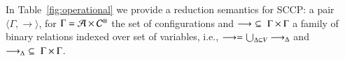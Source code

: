 \documentclass[main.tex]{subfiles}
\begin{document}
In Table~\ref{fig:operational} we provide a reduction semantics for SCCP:
%
a pair $\langle \Gamma,  \rightarrow \rangle$, for $\Gamma = {\mathcal A} \times {\mathcal C}^\otimes$
the set of configurations  and $\longrightarrow \, \, \subseteq \, \,\Gamma \times   \Gamma$ a family 
 of binary relations indexed over set of variables,
i.e., $\longrightarrow = \bigcup_{\Delta \subseteq V} \longrightarrow_\Delta$ and 
$\longrightarrow_\Delta \, \, \subseteq \, \,\Gamma \times \Gamma$.
\end{document}
